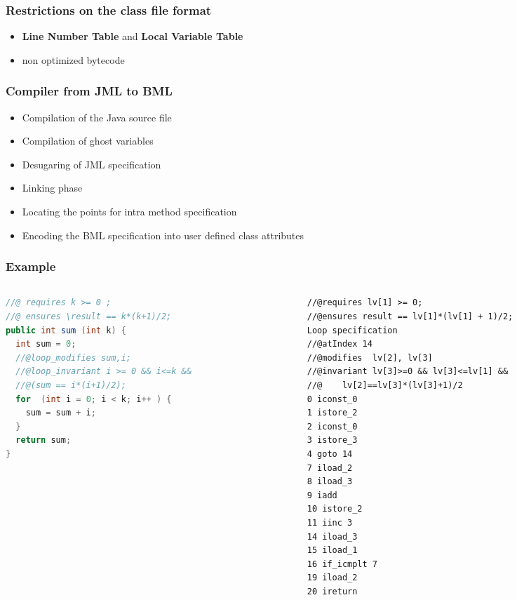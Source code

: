 \documentclass{beamer}
\begin{document}
\begin{frame}[shrink] \frametitle{Restrictions on the class file format}
\begin{itemize}
     \item \textbf{Line Number Table} and \textbf{Local Variable Table}  
     \item non optimized bytecode
 \end{itemize} 
\end{frame}

\begin{frame}[shrink]\frametitle{Compiler from JML to BML}
     \begin{itemize}
          \item Compilation of the Java source file 
	    \item Compilation of ghost variables
	      \item Desugaring of JML specification
		\item Linking phase
		  \item Locating the points for intra method specification 
		    \item Encoding the BML specification into user defined class attributes
       \end{itemize}
\end{frame}


\begin{frame}\frametitle{Example}
\begin{columns}
\begin{column}{5.1cm}
{\tiny
\begin{lstlisting}[language=java]
//@ requires k >= 0 ;
//@ ensures \result == k*(k+1)/2;
public int sum (int k) {
  int sum = 0;		
  //@loop_modifies sum,i;
  //@loop_invariant i >= 0 && i<=k && 
  //@(sum == i*(i+1)/2);
  for  (int i = 0; i < k; i++ ) {
    sum = sum + i;
  } 	
  return sum;
}
\end{lstlisting}}
\end{column}

\begin{column}{5.1cm}
{\tiny
\begin{lstlisting}[language=jvmis]
//@requires lv[1] >= 0;
//@ensures result == lv[1]*(lv[1] + 1)/2;
Loop specification
//@atIndex 14 
//@modifies  lv[2], lv[3]
//@invariant lv[3]>=0 && lv[3]<=lv[1] &&
//@    lv[2]==lv[3]*(lv[3]+1)/2
0 iconst_0
1 istore_2
2 iconst_0
3 istore_3
4 goto 14 
7 iload_2
8 iload_3
9 iadd
10 istore_2 
11 iinc 3 
14 iload_3
15 iload_1
16 if_icmplt 7 
19 iload_2
20 ireturn
\end{lstlisting}}
\end{column}
\end{columns}

\end{frame}
\end{document}
